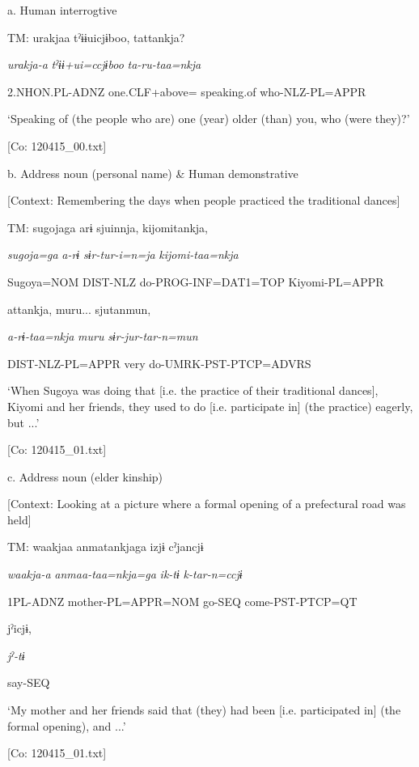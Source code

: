   a.  Human interrogtive

    TM:  urakjaa  tˀɨɨuicjɨboo,  tattankja?

      \textit{urakja-a}  \textit{tˀɨɨ+ui=ccjɨboo}  \textit{ta-ru-taa=nkja}

      2.NHON.PL-ADNZ  one.CLF+above= speaking.of  who-NLZ-PL=APPR

      ‘Speaking of (the people who are) one (year) older (than) you, who (were they)?’

      [Co: 120415\_00.txt]

  b.  Address noun (personal name) \& Human demonstrative

    [Context: Remembering the days when people practiced the traditional dances]

    TM:  sugojaga  arɨ  sjuinnja,  kijomitankja,

      \textit{sugoja=ga}  \textit{a-rɨ}  \textit{sɨr-tur-i=n=ja}  \textit{kijomi-taa=nkja}

      Sugoya=NOM  DIST-NLZ  do-PROG-INF=DAT1=TOP  Kiyomi-PL=APPR

      attankja,  muru...  sjutanmun,

      \textit{a-rɨ-taa=nkja}  \textit{muru}  \textit{sɨr-jur-tar-n=mun}

      DIST-NLZ-PL=APPR  very  do-UMRK-PST-PTCP=ADVRS

      ‘When Sugoya was doing that [i.e. the practice of their traditional dances], Kiyomi and her friends, they used to do [i.e. participate in] (the practice) eagerly, but ...’

      [Co: 120415\_01.txt]

  c.  Address noun (elder kinship)

    [Context: Looking at a picture where a formal opening of a prefectural road was held]

    TM:  waakjaa  anmatankjaga  izjɨ  cˀjancjɨ

      \textit{waakja-a}  \textit{anmaa-taa=nkja=ga}  \textit{ik-tɨ}  \textit{k-tar-n=ccjɨ}

      1PL-ADNZ  mother-PL=APPR=NOM  go-SEQ  come-PST-PTCP=QT

      jˀicjɨ,

      \textit{jˀ-tɨ}

      say-SEQ

      ‘My mother and her friends said that (they) had been [i.e. participated in] (the formal opening), and ...’

      [Co: 120415\_01.txt]

